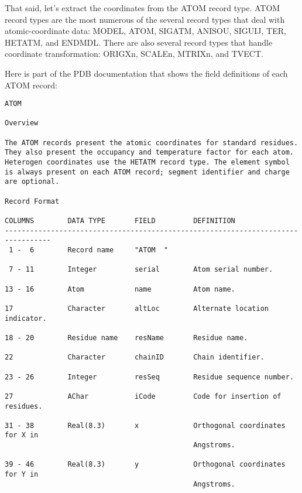 That said, let's extract the coordinates from the ATOM record type. ATOM record types are the most numerous of the several record types that deal with atomic-coordinate data: MODEL, ATOM, SIGATM, ANISOU, SIGUIJ, TER, HETATM, and ENDMDL. There are also several record types that handle coordinate transformation: ORIGXn, SCALEn, MTRIXn, and TVECT.

Here is part of the PDB documentation that shows the field definitions of each ATOM record: 

\begin{lstlisting}
ATOM 

Overview 

The ATOM records present the atomic coordinates for standard residues.
They also present the occupancy and temperature factor for each atom.
Heterogen coordinates use the HETATM record type. The element symbol
is always present on each ATOM record; segment identifier and charge
are optional. 

Record Format 

COLUMNS        DATA TYPE       FIELD         DEFINITION                            
---------------------------------------------------------------------------------
 1 -  6        Record name     "ATOM  "                                            

 7 - 11        Integer         serial        Atom serial number.                   

13 - 16        Atom            name          Atom name.                            

17             Character       altLoc        Alternate location indicator.         

18 - 20        Residue name    resName       Residue name.                         

22             Character       chainID       Chain identifier.                     

23 - 26        Integer         resSeq        Residue sequence number.              

27             AChar           iCode         Code for insertion of residues.       

31 - 38        Real(8.3)       x             Orthogonal coordinates for X in       
                                             Angstroms.                       

39 - 46        Real(8.3)       y             Orthogonal coordinates for Y in       
                                             Angstroms.                            


\end{lstlisting}
